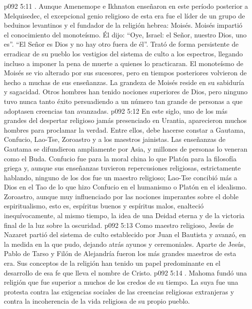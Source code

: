 \vs p092 5:11 . Aunque Amenemope e Ikhnaton enseñaron en este período posterior a Melquisedec, el excepcional genio religioso de esta era fue el líder de un grupo de beduinos levantinos y el fundador de la religión hebrea: Moisés. Moisés impartió el conocimiento del monoteísmo. Él dijo: “Oye, Israel: el Señor, nuestro Dios, uno es”. “El Señor es Dios y no hay otro fuera de él”. Trató de forma persistente de erradicar de su pueblo los vestigios del sistema de culto a los espectros, llegando incluso a imponer la pena de muerte a quienes lo practicaran. El monoteísmo de Moisés se vio alterado por sus sucesores, pero en tiempos posteriores volvieron de hecho a muchas de sus enseñanzas. La grandeza de Moisés reside en su sabiduría y sagacidad. Otros hombres han tenido nociones superiores de Dios, pero ninguno tuvo nunca tanto éxito persuadiendo a un número tan grande de personas a que adoptasen creencias tan avanzadas.
\vs p092 5:12  En este siglo, uno de los más grandes del despertar religioso jamás presenciado en Urantia, aparecieron muchos hombres para proclamar la verdad. Entre ellos, debe hacerse constar a Gautama, Confucio, Lao\hyp{}Tse, Zoroastro y a los maestros jainistas. Las enseñanzas de Gautama se difundieron ampliamente por Asia, y millones de personas lo veneran como el Buda. Confucio fue para la moral china lo que Platón para la filosofía griega y, aunque sus enseñanzas tuvieron repercusiones religiosas, estrictamente hablando, ninguno de los dos fue un maestro religioso; Lao\hyp{}Tse concibió más a Dios en el Tao de lo que hizo Confucio en el humanismo o Platón en el idealismo. Zoroastro, aunque muy influenciado por las nociones imperantes sobre el doble espiritualismo, esto es, espíritus buenos y espíritus malos, enalteció inequívocamente, al mismo tiempo, la idea de una Deidad eterna y de la victoria final de la luz sobre la oscuridad.
\vs p092 5:13  Como maestro religioso, Jesús de Nazaret partió del sistema de culto establecido por Juan el Bautista y avanzó, en la medida en la que pudo, dejando atrás ayunos y ceremoniales. Aparte de Jesús, Pablo de Tarso y Filón de Alejandría fueron los más grandes maestros de esta era. Sus conceptos de la religión han tenido un papel predominante en el desarrollo de esa fe que lleva el nombre de Cristo.
\vs p092 5:14 . Mahoma fundó una religión que fue superior a muchos de los credos de su tiempo. La suya fue una protesta contra las exigencias sociales de las creencias religiosas extranjeras y contra la incoherencia de la vida religiosa de su propio pueblo.
